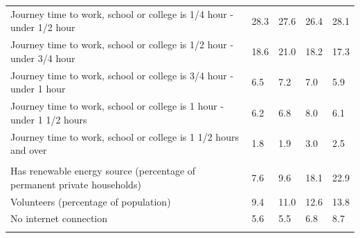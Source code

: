 \documentclass{article}
\begin{document}
\begin{table}[h]
\begin{tabular}{KTTTT}
Journey time to work, school or college is 1/4 hour - under 1/2 hour & 28.3& 27.6& 26.4& 28.1\\
Journey time to work, school or college is 1/2 hour - under 3/4 hour & 18.6& 21.0& 18.2& 17.3\\
Journey time to work, school or college is 3/4 hour - under 1 hour & 6.5& 7.2& 7.0& 5.9\\
Journey time to work, school or college is 1 hour - under 1 1/2 hours & 6.2& 6.8& 8.0& 6.1\\
Journey time to work, school or college is 1 1/2 hours and over & 1.8& 1.9& 3.0& 2.5\\
\hline
    \\ 
    \hline
Has renewable energy source (percentage of permanent private households) &  7.6&  9.6& 18.1& 22.9\\
    \hline
Volunteers (percentage of population) &  9.4& 11.0& 12.6& 13.8\\
    \hline
No internet connection& 5.6& 5.5& 6.8& 8.7\\
\hline
\end{tabular}
\end{table}
\end{document}
